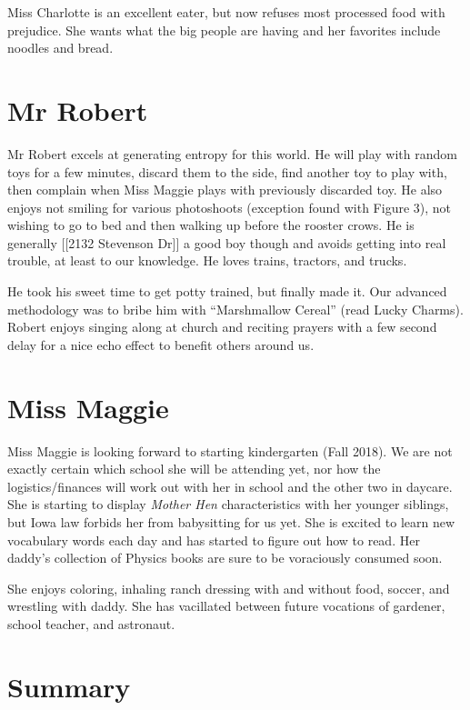 \documentclass[letterpaper,11pt]{article}
\begin{document}
\begin{multicols}{2}
Miss Charlotte is an excellent eater, but now refuses most processed food
with prejudice.  She wants what the big people are having and her favorites
include noodles and bread.

\section{Mr Robert}

Mr Robert excels at generating entropy for this world.  He will play with
random toys for a few minutes, discard them to the side, find another toy to play with,
then complain when Miss Maggie plays with previously discarded toy.  He also
enjoys not smiling for various photoshoots (exception found with Figure 3), not
wishing to go to bed and then walking up before the rooster crows.  He is generally [[2132 Stevenson Dr]] a
good boy though and avoids getting into real trouble, at least to our knowledge.  He loves trains,
tractors, and trucks.

He took his sweet time to get potty trained, but finally made it.  Our advanced
methodology was to bribe him with \enquote{Marshmallow Cereal} (read Lucky
Charms).
Robert enjoys singing along at church and reciting prayers with a few second delay for
a nice echo effect to benefit others around us.

\section{Miss Maggie}

Miss Maggie is looking forward to starting kindergarten (Fall 2018).  We
are not exactly certain which school she will be attending yet, nor how the
logistics/finances will work out with her in school and the other two in
daycare.  She is starting to display \textit{Mother Hen} characteristics with
her younger siblings, but Iowa law forbids her from babysitting for us yet.  She is
excited to learn new vocabulary words each day and has started to figure out
how to read.  Her daddy's collection of Physics books are sure to be
voraciously consumed soon.

She enjoys coloring, inhaling ranch dressing with and without food, soccer, and
wrestling with daddy.  She has vacillated between future vocations of gardener,
school teacher, and astronaut.

\section{Summary}


\end{multicols}
\end{document}
